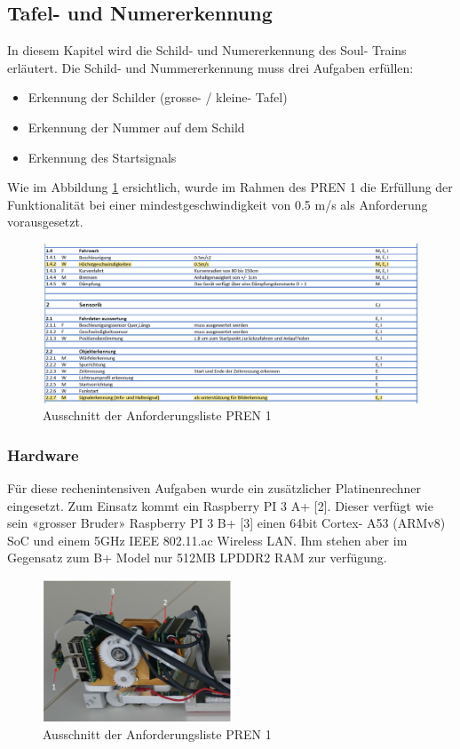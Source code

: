\documentclass[../../main.tex]{subfiles}
\begin{document}
\subsection{Tafel- und Numererkennung} \label{numberdetection}
In diesem Kapitel wird die Schild- und Numererkennung des Soul- Trains erläutert. Die Schild- und Nummererkennung muss drei Aufgaben erfüllen:
\begin{itemize}
  \item Erkennung der Schilder (grosse- / kleine- Tafel)
  \item Erkennung der Nummer auf dem Schild
  \item Erkennung des Startsignals
\end{itemize}

Wie im Abbildung \ref{fig:ausschnitt_Anforderungsliste} ersichtlich, wurde im Rahmen des PREN 1 die Erfüllung der Funktionalität bei einer mindestgeschwindigkeit von 0.5 m/s als Anforderung vorausgesetzt. 

\begin{figure}[H] %
  \centering
  \includegraphics[width=1\textwidth]{Anforderung.png}
  \caption{Ausschnitt der Anforderungsliste PREN 1}
  \label{fig:ausschnitt_Anforderungsliste}
\end{figure}


\subsubsection{Hardware}
Für diese rechenintensiven Aufgaben wurde ein zusätzlicher Platinenrechner eingesetzt. Zum Einsatz kommt ein Raspberry PI 3 A+ [2]. Dieser verfügt wie sein «grosser Bruder» Raspberry PI 3 B+ [3] einen 64bit Cortex- A53 (ARMv8) SoC und einem 5GHz IEEE 802.11.ac Wireless LAN. Ihm stehen aber im Gegensatz zum B+ Model nur 512MB LPDDR2 RAM zur verfügung.   

\begin{figure}[H] %
  \centering
  \includegraphics[width=0.5\textwidth]{RPI-uebersicht.png}
  \caption{Ausschnitt der Anforderungsliste PREN 1}
  \label{fig:rpi-uebersicht}
\end{figure}
\end{document}
